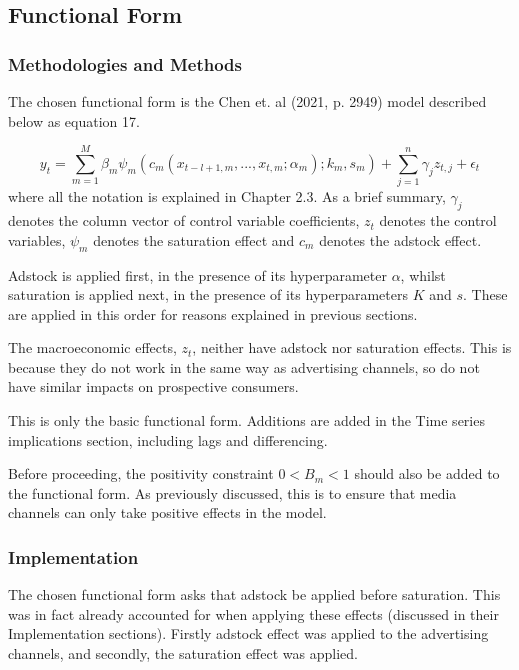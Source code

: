 \documentclass[11pt, a4paper]{article}
\begin{document}
\subsection{Functional Form}

\subsubsection{Methodologies and Methods}

The chosen functional form is the Chen et. al (2021, p. 2949) model described below as equation 17.

\begin{equation}
    y_{t}=\sum_{m=1}^{M}
    \beta_{m}\psi_{m}(c_{m}(x_{t-l+1,m},...,x_{t,m};\alpha_m);k_m,s_m) +\sum_{j=1}^n \gamma_{j}z_{t,j}+\epsilon_{t}
\end{equation}
where all the notation is explained in Chapter 2.3. As a brief summary, 
$\gamma_j$ denotes the column vector of control variable coefficients, $z_{t}$ denotes the control variables, $\psi_{m}$ denotes the saturation effect and $c_{m}$ denotes the adstock effect.

Adstock is applied first, in the presence of its hyperparameter $\alpha$, whilst saturation is applied next, in the presence of its hyperparameters $K$ and $s$. These are applied in this order for reasons explained in previous sections. 

The macroeconomic effects, $z_{t}$, neither have adstock nor saturation effects. This is because they do not work in the same way as advertising channels, so do not have similar impacts on prospective consumers. 

This is only the basic functional form. Additions are added in the Time series implications section, including lags and differencing. 

Before proceeding, the positivity constraint $0<B_{m}<1$ should also be added to the functional form. As previously discussed, this is to ensure that media channels can only take positive effects in the model. 

\subsubsection{Implementation}

The chosen functional form asks that adstock be applied before saturation. This was in fact already accounted for when applying these effects (discussed in their Implementation sections). Firstly adstock effect was applied to the advertising channels, and secondly, the saturation effect was applied. 
\end{document}
